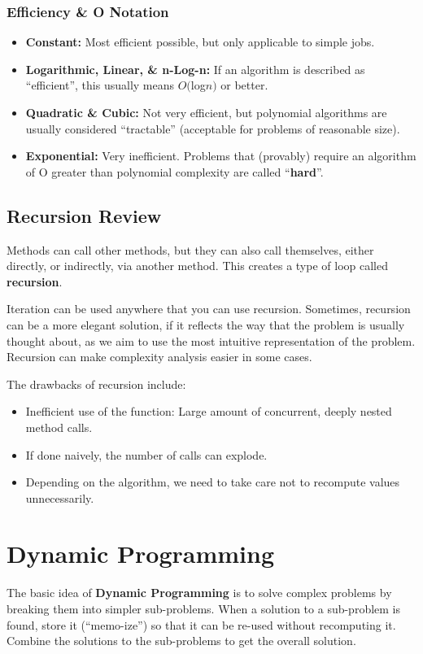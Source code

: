 \documentclass[11pt]{article}
\begin{document}
\subsubsection{Efficiency \& O Notation}
\begin{itemize}
    \item   \textbf{Constant:} Most efficient possible, but only applicable to simple jobs. 
    \item   \textbf{Logarithmic, Linear, \& n-Log-n:} If an algorithm is described as ``efficient'', this usually means 
            $O($log$n)$ or better.
    \item   \textbf{Quadratic \& Cubic:} Not very efficient, but polynomial algorithms are usually considered ``tractable'' 
            (acceptable for problems of reasonable size). 
    \item   \textbf{Exponential:} Very inefficient. Problems that (provably) require an algorithm of O greater than 
            polynomial complexity are called ``\textbf{hard}''.
\end{itemize}

\subsection{Recursion Review}
Methods can call other methods, but they can also call themselves, either directly, or indirectly, via 
another method.
This creates a type of loop called \textbf{recursion}. 

Iteration can be used anywhere that you can use recursion. 
Sometimes, recursion can be a more elegant solution, if it reflects the way that the problem is usually thought 
about, as we aim to use the most intuitive representation of the problem.
Recursion can make complexity analysis easier in some cases.

The drawbacks of recursion include:
\begin{itemize}
    \item   Inefficient use of the function: Large amount of concurrent, deeply nested method calls. 
    \item   If done naively, the number of calls can explode.
    \item   Depending on the algorithm, we need to take care not to recompute values unnecessarily. 
\end{itemize}

\section{Dynamic Programming}
The basic idea of \textbf{Dynamic Programming} is to solve complex problems by breaking them into simpler 
sub-problems. 
When a solution to a sub-problem is found, store it (``memo-ize'') so that it can be re-used without 
recomputing it. 
Combine the solutions to the sub-problems to get the overall solution. 
\end{document}
